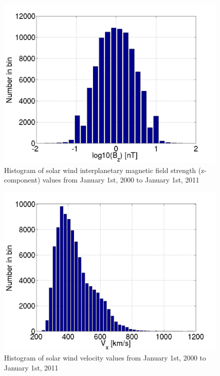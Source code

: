 \begin{figure}
	\centering
	\includegraphics[scale=0.5]{images/hist_BZ.png}
	\caption{Histogram of solar wind interplanetary magnetic field strength
	(z-component) values from January 1st, 2000 to January 1st, 2011}
    \label{fig:hist_bz}
	\figSpace
\end{figure}
\begin{figure}
	\centering
	\includegraphics[scale=0.5]{images/hist_V.png}
	\caption{Histogram of solar wind velocity values from January 1st, 2000 to
	January 1st, 2011}
    \label{fig:hist_v}
	\figSpace
\end{figure}

